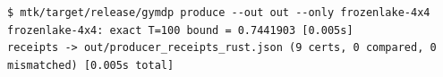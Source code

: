 \begin{Verbatim}[fontsize=\small,frame=leftline,rulecolor=\color{accentmid},framesep=3mm,xleftmargin=3mm]
$ mtk/target/release/gymdp produce --out out --only frozenlake-4x4
frozenlake-4x4: exact T=100 bound = 0.7441903 [0.005s]
receipts -> out/producer_receipts_rust.json (9 certs, 0 compared, 0 mismatched) [0.005s total]
\end{Verbatim}
